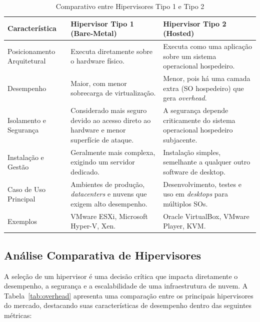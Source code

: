\begin{table}[H]
    \centering
    \caption{Comparativo entre Hipervisores Tipo 1 e Tipo 2}
    \label{tab:comparativo_hipervisores}

    \begin{tabularx}{\textwidth}{|>{\raggedright\arraybackslash}p{}
                                 |>{\raggedright\arraybackslash}X
                                 |>{\raggedright\arraybackslash}X|}
        \hline
        \textbf{Característica} & \textbf{Hipervisor Tipo 1 (Bare-Metal)}
                                & \textbf{Hipervisor Tipo 2 (Hosted)} \\ \hline
        Posicionamento Arquitetural
            & Executa diretamente sobre o hardware físico.
            & Executa como uma aplicação sobre um sistema operacional hospedeiro. \\ \hline
        Desempenho
            & Maior, com menor sobrecarga de virtualização.
            & Menor, pois há uma camada extra (SO hospedeiro) que gera \textit{overhead}. \\ \hline
        Isolamento e Segurança
            & Considerado mais seguro devido ao acesso direto ao hardware e menor superfície de ataque.
            & A segurança depende criticamente do sistema operacional hospedeiro subjacente. \\ \hline
        Instalação e Gestão
            & Geralmente mais complexa, exigindo um servidor dedicado.
            & Instalação simples, semelhante a qualquer outro software de desktop. \\ \hline
        Caso de Uso Principal
            & Ambientes de produção, \textit{datacenters} e nuvens que exigem alto desempenho.
            & Desenvolvimento, testes e uso em \textit{desktops} para múltiplos SOs. \\ \hline
        Exemplos
            & VMware ESXi, Microsoft Hyper-V, Xen.
            & Oracle VirtualBox, VMware Player, KVM. \\ \hline
    \end{tabularx}

\end{table}



\subsection{Análise Comparativa de Hipervisores}
A seleção de um hipervisor é uma decisão crítica que impacta diretamente o desempenho, a segurança e a escalabilidade de uma infraestrutura de nuvem. A Tabela~\ref{tab:overhead} apresenta uma comparação entre os principais hipervisores do mercado, destacando suas características de desempenho dentro das seguintes métricas:

